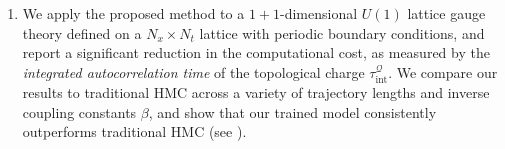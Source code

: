\documentclass{article} %
\begin{document}
\begin{enumerate}
   \item We apply the proposed method to a \(1+1\)-dimensional \(U(1)\) lattice gauge theory defined on a
      \(N_{x}\times N_{t}\) lattice with periodic boundary conditions, and report a significant reduction in the
      computational cost, as measured by the \emph{integrated autocorrelation time} of the topological charge
      \(\tau_{\mathrm{int}}^{\mathcal{Q}}\).
      We compare our results to traditional HMC across a variety of trajectory lengths and inverse coupling constants
      \(\beta\), and show that our trained model consistently outperforms traditional HMC (see
      ).
\end{enumerate}
%
\end{document}
